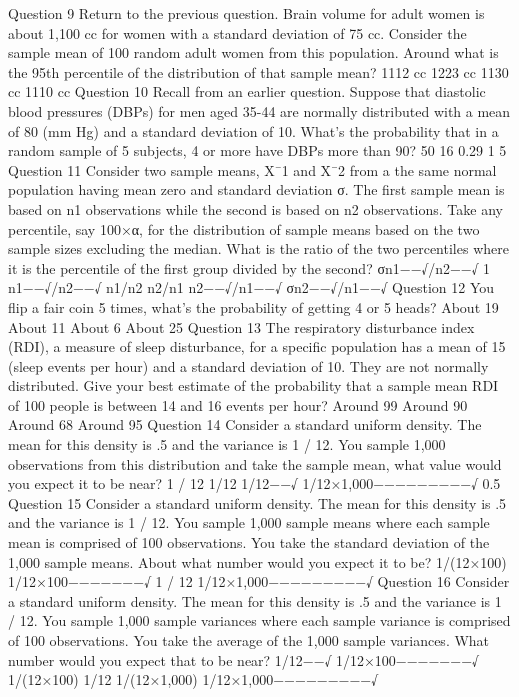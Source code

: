 Question 9
Return to the previous question. Brain volume for adult women is about 1,100 cc for women with a standard deviation of 75 cc. Consider the sample mean of 100 random adult women from this population. Around what is the 95th percentile of the distribution of that sample mean?
1112 cc
1223 cc
1130 cc
1110 cc
Question 10
Recall from an earlier question. Suppose that diastolic blood pressures (DBPs) for men aged 35-44 are normally distributed with a mean of 80 (mm Hg) and a standard deviation of 10. What's the probability that in a random sample of 5 subjects, 4 or more have DBPs more than 90?
50%
16%
0.29 %
1%
5%
Question 11
Consider two sample means, X¯1 and X¯2 from a the same normal population having mean zero and standard deviation σ. The first sample mean is based on n1 observations while the second is based on n2 observations. Take any percentile, say 100×α, for the distribution of sample means based on the two sample sizes excluding the median. What is the ratio of the two percentiles where it is the percentile of the first group divided by the second?
σn1−−√/n2−−√
1
n1−−√/n2−−√
n1/n2
n2/n1
n2−−√/n1−−√
σn2−−√/n1−−√
Question 12
You flip a fair coin 5 times, what's the probability of getting 4 or 5 heads?
About 19%
About 11%
About 6%
About 25%
Question 13
The respiratory disturbance index (RDI), a measure of sleep disturbance, for a specific population has a mean of 15 (sleep events per hour) and a standard deviation of 10. They are not normally distributed. Give your best estimate of the probability that a sample mean RDI of 100 people is between 14 and 16 events per hour?
Around 99%
Around 90%
Around 68%
Around 95%
Question 14
Consider a standard uniform density. The mean for this density is .5 and the variance is 1 / 12. You sample 1,000 observations from this distribution and take the sample mean, what value would you expect it to be near?
1 / 12
1/12
1/12−−√
1/12×1,000−−−−−−−−−√
0.5
Question 15
Consider a standard uniform density. The mean for this density is .5 and the variance is 1 / 12. You sample 1,000 sample means where each sample mean is comprised of 100 observations. You take the standard deviation of the 1,000 sample means. About what number would you expect it to be?
1/(12×100)
1/12×100−−−−−−−√
1 / 12
1/12×1,000−−−−−−−−−√
Question 16
Consider a standard uniform density. The mean for this density is .5 and the variance is 1 / 12. You sample 1,000 sample variances where each sample variance is comprised of 100 observations. You take the average of the 1,000 sample variances. What number would you expect that to be near?
1/12−−√
1/12×100−−−−−−−√
1/(12×100)
1/12
1/(12×1,000)
1/12×1,000−−−−−−−−−√
